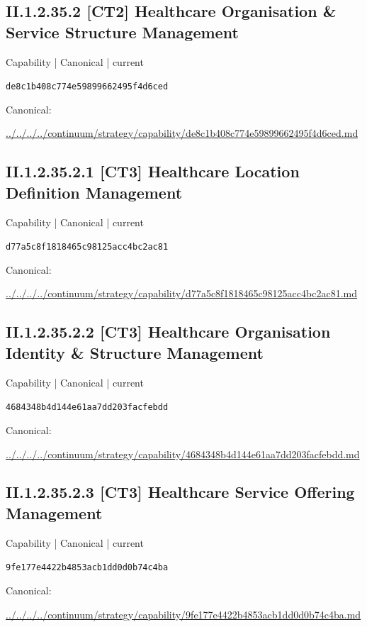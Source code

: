 \documentclass[10pt,a4paper]{article}
\begin{document}
\subsection*{II.1.2.35.2 [CT2] Healthcare Organisation \& Service Structure Management}
{\small Capability | Canonical | current}\par
\texttt{de8c1b408c774e59899662495f4d6ced}\par
Canonical: \par
{\footnotesize\url{../../../../continuum/strategy/capability/de8c1b408c774e59899662495f4d6ced.md}}\par
\subsection*{II.1.2.35.2.1 [CT3] Healthcare Location Definition Management}
{\small Capability | Canonical | current}\par
\texttt{d77a5c8f1818465c98125acc4bc2ac81}\par
Canonical: \par
{\footnotesize\url{../../../../continuum/strategy/capability/d77a5c8f1818465c98125acc4bc2ac81.md}}\par
\subsection*{II.1.2.35.2.2 [CT3] Healthcare Organisation Identity \& Structure Management}
{\small Capability | Canonical | current}\par
\texttt{4684348b4d144e61aa7dd203facfebdd}\par
Canonical: \par
{\footnotesize\url{../../../../continuum/strategy/capability/4684348b4d144e61aa7dd203facfebdd.md}}\par
\subsection*{II.1.2.35.2.3 [CT3] Healthcare Service Offering Management}
{\small Capability | Canonical | current}\par
\texttt{9fe177e4422b4853acb1dd0d0b74c4ba}\par
Canonical: \par
{\footnotesize\url{../../../../continuum/strategy/capability/9fe177e4422b4853acb1dd0d0b74c4ba.md}}\par
\end{document}
